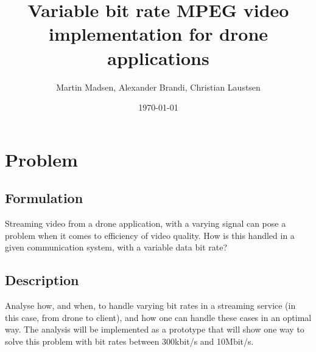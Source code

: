 \documentclass{article}
\title{Variable bit rate MPEG video implementation for drone applications}
\author{Martin Madsen, Alexander Brandi, Christian Laustsen}
\date{\today}
\begin{document}
\maketitle

\section{Problem}
\subsection{Formulation}
Streaming video from a drone application, with a varying signal can pose a problem when it comes to efficiency of video quality. How is this handled in a given communication system, with a variable data bit rate?


\subsection{Description}
Analyse how, and when, to handle varying bit rates in a streaming service (in this case, from drone to client), and how one can handle these cases in an optimal way. The analysis will be implemented as a prototype that will show one way to solve this problem with bit rates between 300kbit/s and 10Mbit/s.
\end{document}
